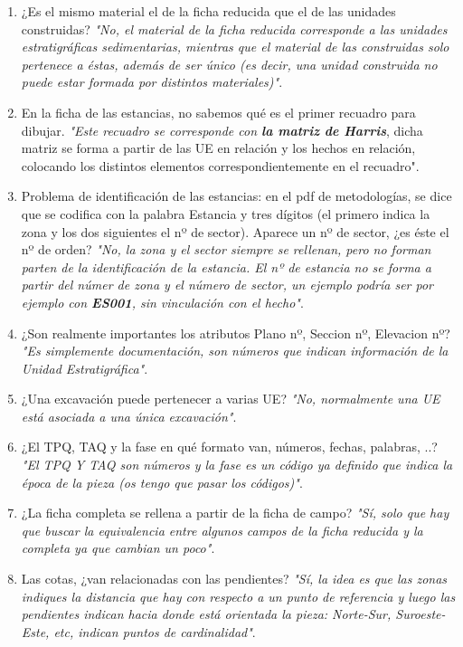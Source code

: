     \begin{enumerate}
        \item ¿Es el mismo material el de la ficha reducida que el de las unidades
        construidas? \textit{"No, el material de la ficha reducida corresponde a las
        unidades estratigráficas sedimentarias, mientras que el material de las
        construidas solo pertenece a éstas, además de ser único (es decir, una unidad
        construida no puede estar formada por distintos materiales)"}.
        \item En la ficha de las estancias, no sabemos qué es el primer recuadro para
        dibujar. \textit{"Este recuadro se corresponde con \textbf{la matriz de Harris}},
        dicha matriz se forma a partir de las UE en relación y los hechos en relación,
        colocando los distintos elementos correspondientemente en el recuadro".
        \item Problema de identificación de las estancias: en el pdf de metodologías, 
        se dice que se codifica con la palabra Estancia y tres dígitos (el primero
        indica la zona y los dos siguientes el nº de sector). Aparece un nº de sector,
        ¿es éste el nº de orden? \textit{"No, la zona y el sector siempre se rellenan,
        pero no forman parten de la identificación de la estancia. El nº de estancia
        no se forma a partir del númer de zona y el número de sector, un ejemplo podría
        ser por ejemplo con \textbf{ES001}, sin vinculación con el hecho"}.
        \item ¿Son realmente importantes los atributos Plano nº, Seccion nº, Elevacion
        nº? \textit{"Es simplemente documentación, son números que indican información
        de la Unidad Estratigráfica"}.
        \item ¿Una excavación puede pertenecer a varias UE? \textit{"No, normalmente una
        UE está asociada a una única excavación"}.
        \item ¿El TPQ, TAQ y la fase en qué formato van, números, fechas, palabras, ..?
        \textit{"El TPQ Y TAQ son números y la fase es un código ya definido que indica
        la época de la pieza (os tengo que pasar los códigos)"}.
        \item ¿La ficha completa se rellena a partir de la ficha de campo? \textit{"Sí,
        solo que hay que buscar la equivalencia entre algunos campos de la ficha
        reducida y la completa ya que cambian un poco"}.
        \item Las cotas, ¿van relacionadas con las pendientes? \textit{"Sí, la idea es
        que las zonas indiques la distancia que hay con respecto a un punto de referencia
        y luego las pendientes indican hacia donde está orientada la pieza: Norte-Sur,
        Suroeste-Este, etc, indican puntos de cardinalidad"}.
    \end{enumerate}

